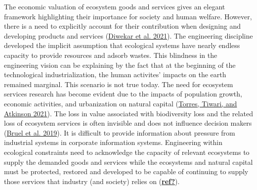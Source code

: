 \documentclass[
  14pt,
]{extarticle}
\begin{document}
The economic valuation of ecosystem goods and services gives an elegant framework highlighting their importance for society and human welfare.
However, there is a need to explicitly account for their contribution when designing and developing products and services (\protect\hyperlink{ref-Diwekar2021}{Diwekar et al. 2021}).
The engineering discipline developed the implicit assumption that ecological systems have nearly endless capacity to provide resources and adsorb wastes.
This blindness in the engineering vision can be explaining by the fact that at the beginning of the technological industrialization, the human activites' impacts on the earth remained marginal. This scenario is not true today.
The need for ecosystem services research has become evident due to the impacts of population growth, economic activities, and urbanization on natural capital (\protect\hyperlink{ref-Torres2021}{Torres, Tiwari, and Atkinson 2021}).
The loss in value associated with biodiversity loss and the related loss of ecosystem services is often invisible and does not influence decision makers (\protect\hyperlink{ref-Bruel2018}{Bruel et al. 2019}).
It is difficult to provide information about pressure from industrial systems in corporate information systems.
Engineering within ecological constraints need to acknowledge the capacity of relevant ecosystems to supply the demanded goods and services while the ecosystems and natural capital must be protected, restored and developed to be capable of continuing to supply those services that industry (and society) relies on (\protect\hyperlink{ref-ref}{\textbf{ref?}}).
\end{document}
